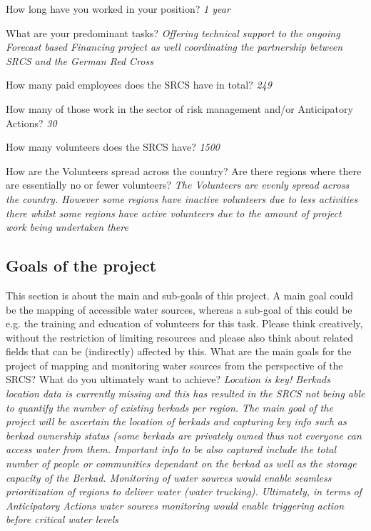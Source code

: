 How long have you worked in your position?\newline
\textit{1 year}

What are your predominant tasks?\newline
\textit{Offering technical support to the ongoing Forecast based Financing project as well coordinating the partnership between SRCS and the German Red Cross}

How many paid employees does the SRCS have in total?\newline
\textit{249}

How many of those work in the sector of risk management and/or Anticipatory Actions?\newline
\textit{30}

How many volunteers does the SRCS have?\newline
\textit{1500}

How are the Volunteers spread across the country? Are there regions where there are essentially no or fewer volunteers?\newline
\textit{The Volunteers are evenly spread across the country. However some regions have inactive volunteers due to less activities there whilst some regions have active volunteers due to the amount of project work being undertaken there
}

\subsection*{Goals of the project}

This section is about the main and sub-goals of this project. A main goal could be the mapping of accessible water sources, whereas a sub-goal of this could be e.g. the training and education of volunteers for this task. Please think creatively, without the restriction of limiting resources and please also think about related fields that can be (indirectly) affected by this.\newline
What are the main goals for the project of mapping and monitoring water sources from the perspective of the SRCS? What do you ultimately want to achieve?\newline
\textit{Location is key! Berkads location data is currently missing and this has resulted in the SRCS not being able to quantify the number of existing berkads per region. The main goal of the project will be ascertain the location of berkads and capturing key info such as berkad ownership status (some berkads are privately owned thus not everyone can access water from them. Important info to be also captured include the total number of people or communities dependant on the berkad as well as the storage capacity of the Berkad. Monitoring of water sources would enable seamless prioritization of regions to deliver water (water trucking). Ultimately, in terms of Anticipatory Actions water sources monitoring would enable triggering action before critical water levels}

